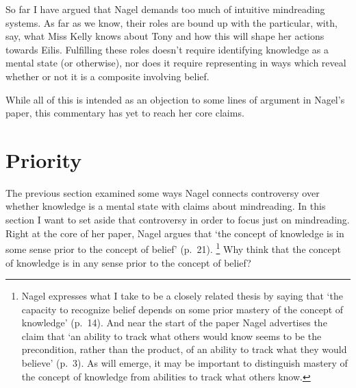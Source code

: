 \documentclass[11pt,a4paper]{extarticle}
\begin{document}
So far I have argued that Nagel demands too much of intuitive mindreading systems.
As far as we know, their roles are bound up with the particular, with, say, what Miss Kelly knows about Tony and how this will shape her actions towards Eilis.
Fulfilling these roles doesn't require identifying knowledge as a mental state (or otherwise),
nor does it require representing in ways which reveal whether or not it is a composite involving belief.

While all of this is intended as an objection to some lines of argument in Nagel's paper, this commentary has yet to reach her core claims.




\section{Priority}
The previous section examined some ways  Nagel connects  controversy over whether knowledge is a mental state with claims about mindreading.
In this section I want to set aside that controversy in order to focus just on mindreading.
Right at the core of her paper, Nagel argues that  `the concept of knowledge is in some sense prior to the concept of belief' (p.\ 21).%
\footnote{
Nagel expresses what I take to be a closely related thesis by saying that `the capacity to recognize belief depends on some prior mastery of the concept of knowledge' (p.\ 14).
And near the start of the paper Nagel advertises the claim that `an ability to track what others would know seems to be the precondition, rather than the product, of an ability to track what they would believe' (p.\ 3).
As will emerge,
it may be important to distinguish mastery of the concept of knowledge from abilities to track what others know.
}
Why think that the concept of knowledge is in any sense prior to the concept of belief?
\end{document}
